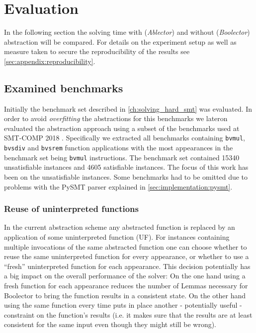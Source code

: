 \chapter{Evaluation}
\label{ch:evaluation}
In the following section the solving time with (\textit{Ablector}) and without (\textit{Boolector}) abstraction will be compared.
For details on the experiment setup as well as measure taken to secure the reproducibility of the results see \ref{sec:appendix:reproducibility}.
\section{Examined benchmarks}
Initially the benchmark set described in \ref{ch:solving_hard_smt} was evaluated.
In order to avoid \textit{overfitting} the abstractions for this benchmarks we lateron
evaluated the abstraction approach using a subset of the benchmarks used at SMT-COMP 2018 \cite{SMTCOMP18}.
Specifically we extracted all benchmarks containing \texttt{bvmul}, \texttt{bvsdiv} and \texttt{bvsrem} function applications with the most appearances in the benchmark set being \texttt{bvmul} instructions.
The benchmark set contained 15340 unsatisfiable instances and 4605 satisfiable instances. The focus of this work has been on the unsatisfiable instances.
Some benchmarks had to be omitted due to problems with the PySMT parser explained in \ref{sec:implementation:pysmt}.

\subsection{Reuse of uninterpreted functions}
In the current abstraction scheme any abstracted function is replaced by an application of some uninterpreted function (UF).
For instances containing multiple invocations of the same abstracted function one can choose whether to reuse the same uninterpreted function for every appearance,
or whether to use a \enquote{fresh} uninterpreted function for each appearance.
This decision potentially has a big impact on the overall performance of the solver:
On the one hand using a fresh function for each appearance reduces the number of Lemmas necessary for Boolector to bring the function results in a consistent state.
On the other hand using the same function every time puts in place another - potentially useful - constraint on the function's results
(i.e. it makes sure that the results are at least consistent for the same input even though they might still be wrong).

